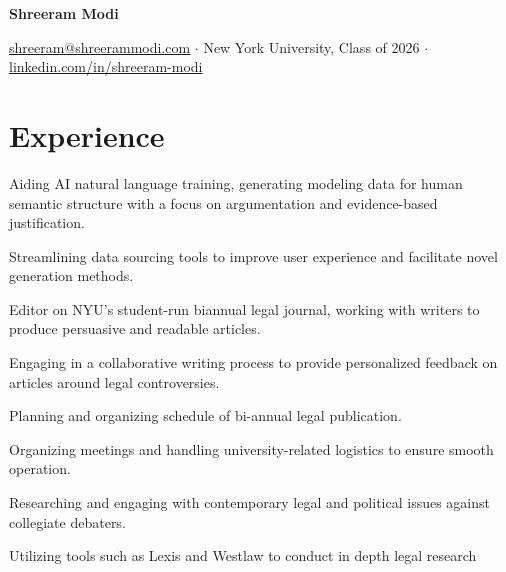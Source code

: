 \documentclass[letterpaper]{resume-shreeram}
\begin{document}
\begin{center}
  {\Huge \bfseries Shreeram Modi}

  \href{mailto:shreeram@shreerammodi.com}{shreeram@shreerammodi.com}
  $\cdot$
  New York University, Class of 2026
  $\cdot$
  \href{https://linkedin.com/in/shreeram-modi}{linkedin.com/in/shreeram-modi}
\end{center}

\section{Experience}

\begin{compactitem}
  \item
    Aiding AI natural language training, generating modeling data for human semantic structure with a focus on argumentation and evidence-based justification.

  \item
    Streamlining data sourcing tools to improve user experience and facilitate novel generation methods.
\end{compactitem}

\begin{compactitem}
  \item
    Editor on NYU's student-run biannual legal journal, working with writers to produce persuasive and readable articles.

  \item
    Engaging in a collaborative writing process to provide personalized feedback on articles around legal controversies.
\end{compactitem}

\begin{compactitem}
  \item
    Planning and organizing schedule of bi-annual legal publication.

  \item
    Organizing meetings and handling university-related logistics to ensure smooth operation.
\end{compactitem}

\begin{compactitem}
  \item
    Researching and engaging with contemporary legal and political issues against collegiate debaters.

  \item
    Utilizing tools such as Lexis and Westlaw to conduct in depth legal research
\end{compactitem}
\end{document}
